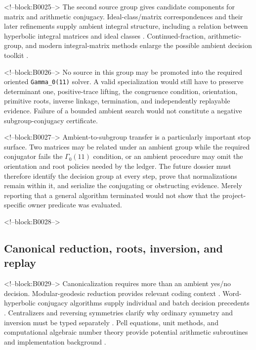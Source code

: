 \documentclass[11pt]{article}
\begin{document}
<!--block:B0025-->
The second source group gives candidate components for matrix and
arithmetic conjugacy. Ideal-class/matrix correspondences and their later
refinements supply ambient integral structure, including a relation
between hyperbolic integral matrices and ideal classes
\citep{P31-S07,P31-S08,P31-S09}.
Continued-fraction, arithmetic-group, and modern integral-matrix methods
enlarge the possible ambient decision toolkit
\citep{P31-S10,P31-S11,P31-S12,P31-S13}.

<!--block:B0026-->
No source in this group may be promoted into the required oriented
\texttt{Gamma\_0(11)} solver. A valid specialization would still have to
preserve determinant one, positive-trace lifting, the congruence
condition, orientation, primitive roots, inverse linkage, termination,
and independently replayable evidence. Failure of a bounded ambient
search would not constitute a negative subgroup-conjugacy certificate.

<!--block:B0027-->
Ambient-to-subgroup transfer is a particularly important stop surface.
Two matrices may be related under an ambient group while the required
conjugator fails the $\Gamma_0(11)$ condition, or an ambient procedure
may omit the orientation and root policies needed by the ledger. The
future dossier must therefore identify the decision group at every
step, prove that normalizations remain within it, and serialize the
conjugating or obstructing evidence. Merely reporting that a general
algorithm terminated would not show that the project-specific owner
predicate was evaluated.

<!--block:B0028-->
\hypertarget{23-canonical-reduction-roots-inversion-and-replay}{%
\subsection{Canonical reduction, roots, inversion, and
replay}\label{23-canonical-reduction-roots-inversion-and-replay}}

<!--block:B0029-->
Canonicalization requires more than an ambient yes/no decision.
Modular-geodesic reduction provides relevant coding context
\citep{P31-S15}.
Word-hyperbolic conjugacy algorithms supply individual and batch decision
precedents
\citep{P31-S16,P31-S17}.
Centralizers and reversing symmetries clarify why ordinary symmetry and
inversion must be typed separately
\citep{P31-S18}.
Pell equations, unit methods, and computational algebraic number theory
provide potential arithmetic subroutines and implementation background
\citep{P31-S19,P31-S20}.
\end{document}
